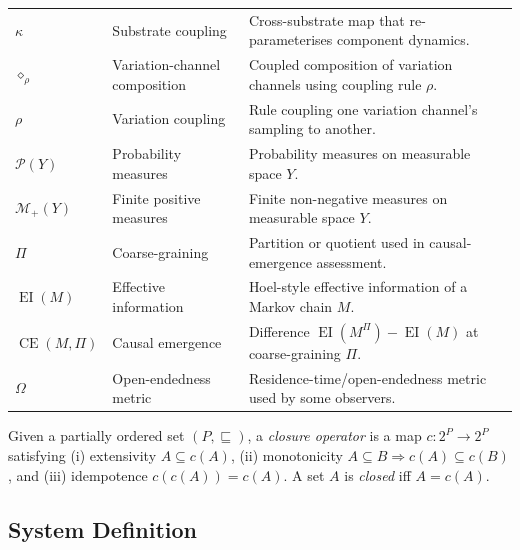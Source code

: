 \documentclass[journal]{IEEEtran}
\theoremstyle{plain}
\theoremstyle{definition}
\theoremstyle{plain}
\DeclareMathOperator{\EI}{EI}
\DeclareMathOperator{\CE}{CE}
\newcommand{\Pmeas}{\mathcal{P}}
\newcommand{\Mplus}{\mathcal{M}_{+}}
\begin{document}
\begin{table}[!t]
\begin{tabular}{@{}p{} p{} p{}@{}}
$\kappa$ & Substrate coupling & Cross-substrate map that re-parameterises component dynamics. \\
$\diamond_\rho$ & Variation-channel composition & Coupled composition of variation channels using coupling rule $\rho$. \\
$\rho$ & Variation coupling & Rule coupling one variation channel's sampling to another. \\
$\Pmeas(Y)$ & Probability measures & Probability measures on measurable space $Y$. \\
$\Mplus(Y)$ & Finite positive measures & Finite non-negative measures on measurable space $Y$. \\
$\Pi$ & Coarse-graining & Partition or quotient used in causal-emergence assessment. \\
$\EI(M)$ & Effective information & Hoel-style effective information of a Markov chain $M$. \\
$\CE(M,\Pi)$ & Causal emergence & Difference $\EI(M^\Pi)-\EI(M)$ at coarse-graining $\Pi$. \\
$\Omega$ & Open-endedness metric & Residence-time/open-endedness metric used by some observers. \\
\hline
\end{tabular}
\end{table}

Given a partially ordered set $(P,\sqsubseteq)$, a \emph{closure operator} is
a map $c : 2^P \to 2^P$ satisfying (i) extensivity $A \subseteq c(A)$,
(ii) monotonicity $A \subseteq B \Rightarrow c(A) \subseteq c(B)$, and
(iii) idempotence $c(c(A)) = c(A)$. A set $A$ is \emph{closed} iff $A = c(A)$.

\subsection{System Definition}\label{sec:framework}
\end{document}
